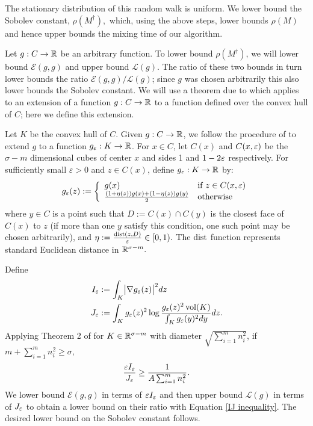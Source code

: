 The stationary distribution of this random walk is uniform.  %
We lower bound the Sobolev constant, $\rho(M^\dag),$ which, using the above steps, lower bounds $\rho(M)$ and hence upper bounds the mixing time of our algorithm.

Let $g:C\to \mathbb{R}$ be an arbitrary function.  To lower bound $\rho(M^\dag)$, we will lower bound $\mathcal{E}(g,g)$ and upper bound $\mathcal{L}(g)$.  The ratio of these two bounds in turn lower bounds the ratio $\mathcal{E}(g,g)/\mathcal{L}(g)$; since $g$ was chosen arbitrarily this also lower bounds the Sobolev constant. 
We will use a theorem due to \cite{Frieze1998} which applies to an extension of a function $g:C\to \mathbb{R}$ to a function defined over the convex hull of $C$; here we define this extension. 

Let $K$ be the convex hull of $C$.  Given $g: C\rightarrow \mathbb{R}$, we follow the procedure of \cite{Frieze1998, Shah2010} to extend $g$ to a function $g_\varepsilon: K\rightarrow \mathbb{R}$.  For $x\in C$, let $C(x)$ and $C(x,\varepsilon)$ be the $\sigma-m$ dimensional cubes of center $x$ and sides 1 and $1-2\varepsilon$ respectively.  For sufficiently small $\varepsilon>0$ and $z\in C(x)$, define $g_\varepsilon : K\rightarrow \mathbb{R}$ by:
\begin{equation*}\label{e:feps defn}
g_\varepsilon(z) := \left\{\begin{array}{ll}g(x) & \text{if } z\in C(x,\varepsilon)\\
\frac{(1+\eta(z))g(x) + (1-\eta(z))g(y)}{2} & \text{otherwise } \end{array}\right.
\end{equation*}
\normalsize
where $y\in C$ is a point such that $D := C(x)\cap C(y)$ is the closest face of $C(x)$ to $z$ (if more than one $y$ satisfy this condition, one such point may be chosen arbitrarily), and $\eta := \frac{\operatorname{ dist }(z,D)}{\varepsilon}\in[0,1).$  The $\operatorname{ dist }$ function represents standard Euclidean distance in $\mathbb{R}^{\sigma-m}.$   

Define
\small
\begin{align}
I_{\varepsilon} &:= \int_K \bigl|\nabla g_\varepsilon(z)\bigr|^2dz\\
J_{\varepsilon} &:= \int_K g_\varepsilon(z)^2\log\frac{g_\varepsilon(z)^2\operatorname{ vol }(K)}{\int_K g_\varepsilon(y)^2dy}dz. \label{e:Jeps}
\end{align}
\normalsize
Applying Theorem 2 of \cite{Frieze1998} for $K\in \mathbb{R}^{\sigma-m}$ with diameter $\sqrt{\sum_{i=1}^m n_i^2}$, if $m+\sum_{i=1}^mn_i^2\geq\sigma,$
\begin{equation}\label{IJ inequality}\frac{\varepsilon I_\varepsilon}{J_\varepsilon}\geq \frac{1}{A\sum_{i=1}^m n_i^2}.\end{equation}
We lower bound $\mathcal{E}(g,g)$ in terms of $\varepsilon I_\varepsilon$ and then upper bound $\mathcal{L}(g)$ in terms of $J_\varepsilon$ to obtain a lower bound on their ratio with Equation \eqref{IJ inequality}.  
The desired lower bound on the Sobolev constant follows. 

